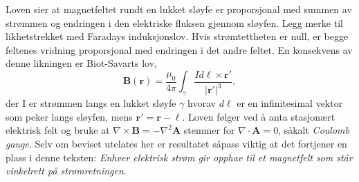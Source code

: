 \documentclass[twoside,utf8]{article}
\begin{document}
  Loven sier at magnetfeltet rundt en lukket sløyfe er proporsjonal med summen av strømmen og endringen i den elektriske fluksen gjennom sløyfen. Legg merke til likhetstrekket med Faradays induksjonslov. Hvis strømtettheten er null, er begge feltenes vridning proporsjonal med endringen i det andre feltet. En konsekvens av denne likningen er Biot-Savarts lov,
  $$
  \mathbf{B}(\mathbf{r}) = \frac{\mu_0}{4\pi}\int_\gamma \frac{I d\mathbf{\ell} \times \mathbf{r}'}{|\mathbf{r}'|^3},
  $$
  der I er strømmen langs en lukket sløyfe $\gamma$ hvorav $d\mathbf{\ell}$ er en infinitesimal vektor som peker langs sløyfen, mens $\mathbf{r}'=\mathbf{r}-\mathbf{\ell}$. Loven følger ved å anta stasjonært elektrisk felt og bruke at $\nabla \times \mathbf{B}=-\nabla^2 \mathbf{A}$ stemmer for $\nabla \cdot \mathbf{A} = 0$, såkalt {\it Coulomb gauge}. Selv om beviset utelates her er resultatet såpass viktig at det fortjener en plass i denne teksten: {\it Enhver elektrisk strøm gir opphav til et magnetfelt som står vinkelrett på strømretningen}.
\end{document}
